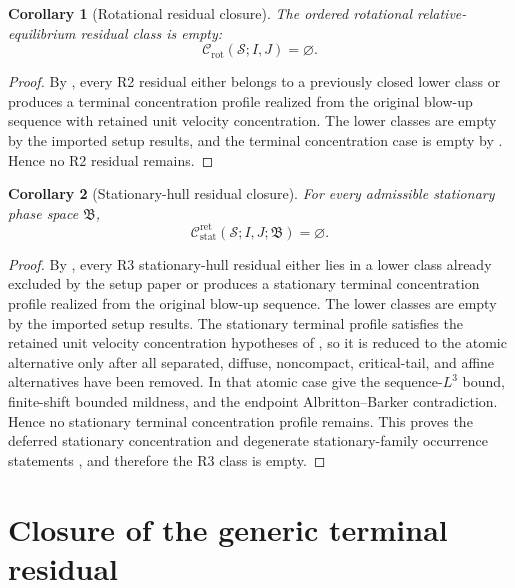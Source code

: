 \documentclass[11pt]{amsart}
\numberwithin{equation}{section}
\theoremstyle{plain}
\newtheorem{corollary}[corollary]{Corollary}
\theoremstyle{definition}
\theoremstyle{remark}
\newcommand{\Crot}{\mathcal C_{\mathrm{rot}}}
\newcommand{\Cstat}{\mathcal C_{\mathrm{stat}}^{\mathrm{ret}}}
\begin{document}
\begin{corollary}[Rotational residual closure]
\label{cor:R2-closure}
The ordered rotational relative-equilibrium residual class is empty:
\[
   \Crot(\mathcal S;I,J)=\varnothing .
\]
\end{corollary}

\begin{proof}
By , every R2 residual either belongs to a
previously closed lower class or produces a terminal concentration profile
realized from the original blow-up sequence with retained unit velocity concentration.
The lower classes are empty by the imported setup results, and the terminal
concentration case is empty by
.  Hence no R2 residual remains.
\end{proof}

\begin{corollary}[Stationary-hull residual closure]
\label{cor:R3-closure}
For every admissible stationary phase space \(\mathfrak B\),
\[
   \Cstat(\mathcal S;I,J;\mathfrak B)=\varnothing .
\]
\end{corollary}

\begin{proof}
By
, every R3
stationary-hull residual either lies in a lower class already excluded by the setup paper or produces
a stationary terminal concentration profile realized from the original blow-up
sequence.  The lower classes are empty by the imported setup results.  The stationary terminal
profile satisfies the retained unit velocity concentration hypotheses of
, so it is reduced to the atomic alternative
only after all separated, diffuse, noncompact, critical-tail, and affine
alternatives have been removed.  In that atomic case
give the sequence-\(L^3\) bound, finite-shift bounded mildness, and the endpoint
Albritton--Barker contradiction.  Hence no stationary terminal concentration profile remains.
This proves the deferred stationary concentration and degenerate stationary-family
occurrence statements
,
and therefore the R3 class is empty.
\end{proof}

\section{Closure of the generic terminal residual}
\label{sec:R4-closure}
\end{document}
